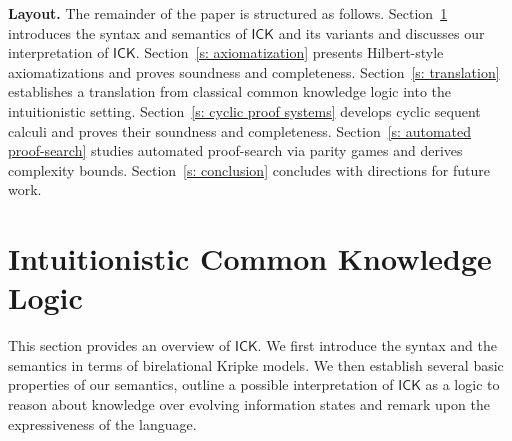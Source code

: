 \documentclass{myifcolog}
\newcommand{\ICK}{\mathsf{ICK}}
\numberwithin{theorem}{section}
\begin{document}
\noindent \textbf{Layout.} The remainder of the paper is structured as follows. Section~\ref{s: intuitionistic common knowledge logic} introduces the syntax and semantics of $\mathsf{ICK}$ and its variants and discusses our interpretation of $\ICK$. Section~\ref{s: axiomatization} presents Hilbert-style axiomatizations and proves soundness and completeness. Section~\ref{s: translation} establishes a translation from classical common knowledge logic into the intuitionistic setting. Section~\ref{s: cyclic proof systems} develops cyclic sequent calculi and proves their soundness and completeness. Section~\ref{s: automated proof-search} studies automated proof-search via parity games and derives complexity bounds. Section~\ref{s: conclusion} concludes with directions for future work.

\section{Intuitionistic Common Knowledge Logic}\label{s: intuitionistic common knowledge logic}

This section provides an overview of $\ICK$. We first introduce the syntax and the semantics in terms of birelational Kripke models. We then establish several basic properties of our semantics, outline a possible interpretation of $\ICK$ as a logic to reason about knowledge over evolving information states and remark upon the expressiveness of the language.
\end{document}
